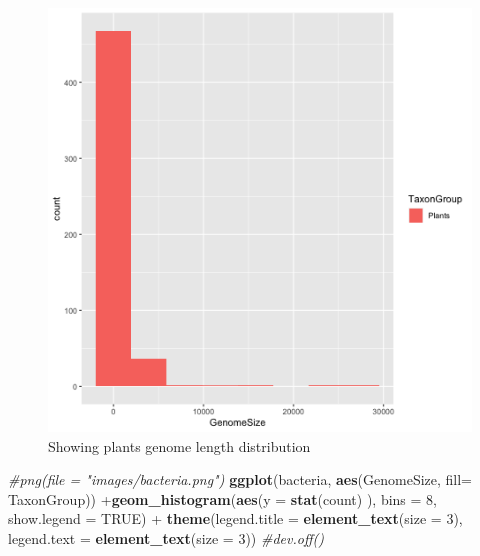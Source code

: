 \documentclass[10pt,a4paper,]{article}
\newenvironment{Shaded}{}{}
\newcommand{\CommentTok}[1]{\textcolor[rgb]{0.38,0.63,0.69}{\textit{#1}}}
\newcommand{\DataTypeTok}[1]{\textcolor[rgb]{0.56,0.13,0.00}{#1}}
\newcommand{\DecValTok}[1]{\textcolor[rgb]{0.25,0.63,0.44}{#1}}
\newcommand{\KeywordTok}[1]{\textcolor[rgb]{0.00,0.44,0.13}{\textbf{#1}}}
\newcommand{\NormalTok}[1]{#1}
\newcommand{\OperatorTok}[1]{\textcolor[rgb]{0.40,0.40,0.40}{#1}}
\newcommand{\OtherTok}[1]{\textcolor[rgb]{0.00,0.44,0.13}{#1}}
\newcommand{\StringTok}[1]{\textcolor[rgb]{0.25,0.44,0.63}{#1}}
\begin{document}
\begin{figure}
\centering
\includegraphics{images/plants.png}
\caption{Showing plants genome length distribution}
\end{figure}

\begin{Shaded}
\begin{Highlighting}[]
\CommentTok{#png(file = "images/bacteria.png")}
\KeywordTok{ggplot}\NormalTok{(bacteria, }\KeywordTok{aes}\NormalTok{(GenomeSize, }\DataTypeTok{fill=}\NormalTok{ TaxonGroup)) }\OperatorTok{+}\KeywordTok{geom_histogram}\NormalTok{(}\KeywordTok{aes}\NormalTok{(}\DataTypeTok{y =} \KeywordTok{stat}\NormalTok{(count) ), }\DataTypeTok{bins =} \DecValTok{8}\NormalTok{, }\DataTypeTok{show.legend =} \OtherTok{TRUE}\NormalTok{) }\OperatorTok{+}\StringTok{ }\KeywordTok{theme}\NormalTok{(}\DataTypeTok{legend.title =} \KeywordTok{element_text}\NormalTok{(}\DataTypeTok{size =} \DecValTok{3}\NormalTok{),}
               \DataTypeTok{legend.text =} \KeywordTok{element_text}\NormalTok{(}\DataTypeTok{size =} \DecValTok{3}\NormalTok{))}
\CommentTok{#dev.off()}
\end{Highlighting}
\end{Shaded}
\end{document}
